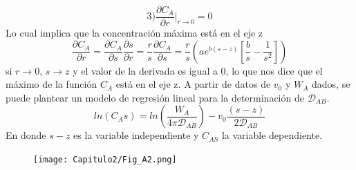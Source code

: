  \begin{equation*}
     3) \frac{\partial C_A}{\partial r}|_{r\rightarrow0}=0
 \end{equation*}
 Lo cual implica que la concentración máxima está en el eje z
 \begin{equation*}
    \frac{\partial C_A}{\partial r}=\frac{\partial C_A}{\partial s}\frac{\partial s}{\partial r}=\frac{r}{s}\frac{\partial C_A}{\partial s}=\frac{r}{s}(ae^{b(s-z)}[\frac{b}{s}-\frac{1}{s^2}])
 \end{equation*}
 si $r\rightarrow0$, $s\rightarrow z$ y el valor de la derivada es igual a 0, lo que nos dice que el máximo de la función $C_A$ está en el eje z.
 A partir de datos de $v_0$ y $W_A$ dados, se puede plantear un modelo de regresión lineal para la determinación de $\mathscr{D}_{AB}$.
 \begin{equation*}
     ln(C_As)=ln(\frac{W_A}{4\pi \mathscr{D}_{AB}})-v_0\frac{(s-z)}{2\mathscr{D}_{AB}}
 \end{equation*}
 En donde $s-z$ es la variable independiente y $C_{AS}$ la variable dependiente.

\begin{figure}[H]
    \centering
    \texttt{[image: Capitulo2/Fig\_A2.png]}
\end{figure}
\endgroup
 

